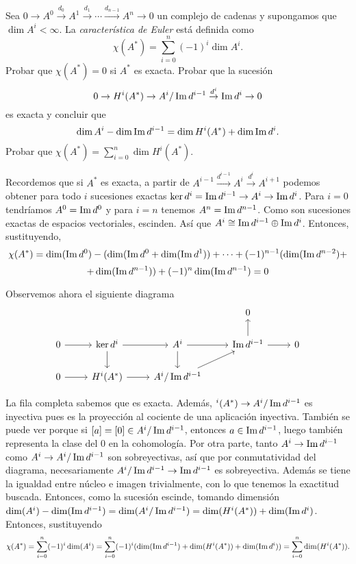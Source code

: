 \documentclass[twoside]{article}
\begin{document}
\begin{ejercicio}{4.4}
Sea $0\to A^0\overset{d_0}{\to}A^1\overset{d_1}{\to}\cdots\overset{d_{n-1}}{\to}A^n\to 0$ un complejo de cadenas y supongamos que $\dim A^i<\infty$. La \emph{característica de Euler} está definida como
\[
\chi(A^*)=\sum_{i=0}^n (-1)^i\dim A^i.
\]
Probar que $\chi(A^*)=0$ si $A^*$ es exacta. Probar que la sucesión 
\[
0\to H^i(A^*)\to A^i/\operatorname{Im} d^{i-1}\overset{d^i}{\to}\operatorname{Im} d^i\to 0
\]
es exacta y concluir que
\[
\dim A^i-\dim\operatorname{Im} d^{i-1}=\dim H^i(A^*)+\dim\operatorname{Im} d^i.
\]
Probar que $\chi(A^*)=\sum_{i=0}^n\dim H^i(A^*)$.
\end{ejercicio}
\begin{solucion}
Recordemos que si $A^*$ es exacta, a partir de $A^{i-1}\overset{d^{i-1}}{\to} A^i\overset{d^i}{\to} A^{i+1}$ podemos obtener para todo $i$ sucesiones exactas $\ker{d^i}=\operatorname{Im}{d^{i-1}}\to A^i\to \operatorname{Im}{d^i}$. Para $i=0$ tendríamos $A^0=\operatorname{Im}{d^0}$ y para $i=n$ tenemos $A^n=\operatorname{Im}{d^{n-1}}$. Como son sucesiones exactas de espacios vectoriales, escinden. Así que $A^i\cong \operatorname{Im}{d^{i-1}}\oplus\operatorname{Im}{d^i}$. Entonces, sustituyendo,
\[
\chi(A^*)=\dim(\operatorname{Im}{d^0})-(\dim(\operatorname{Im}{d^0}+\dim(\operatorname{Im}{d^1}))+\cdots +(-1)^{n-1}(\dim(\operatorname{Im}{d^{n-2}})+
\]
\[
+\dim(\operatorname{Im}{d^{n-1}}))+(-1)^n\dim(\operatorname{Im}{d^{n-1}})=0
\]

Observemos ahora el siguiente diagrama
\[
\begin{tikzcd}
 & & & 0 &  \\
 0\arrow[r] & \ker{d^i}\arrow[d]\arrow[r] & A^i\arrow[d]\arrow[r] & \Ima{d^{i-1}}\arrow[r]\arrow[u] & 0\\
0 \arrow[r] &  H^i(A^*)\arrow[r] & A^i/ \Ima{d^{i-1}}\arrow[ur] & & 
\end{tikzcd}
\]

La fila completa sabemos que es exacta.  Además, $^i(A^*)\to A^i/ \operatorname{Im}{d^{i-1}}$ es inyectiva pues es la proyección al cociente de una aplicación inyectiva. También se puede ver porque si $[a]=[0]\in  A^i/ \operatorname{Im}{d^{i-1}}$, entonces $a\in  \operatorname{Im}{d^{i-1}}$, luego también representa la clase del 0 en la cohomología. Por otra parte, tanto $A^i\to \operatorname{Im}{d^{i-1}}$ como $A^i\to A^i/ \operatorname{Im}{d^{i-1}}$ son sobreyectivas, así que por conmutatividad del diagrama, necesariamente $ A^i/ \operatorname{Im}{d^{i-1}}\to \operatorname{Im}{d^{i-1}}$ es sobreyectiva. Además se tiene la igualdad entre núcleo e imagen trivialmente, con lo que tenemos la exactitud buscada. Entonces, como la sucesión escinde, tomando dimensión $\dim(A^i)-\dim(\operatorname{Im}{d^{i-1}})=\dim(A^i/\operatorname{Im}{d^{i-1}})=\dim(H^i(A^ *))+\dim(\operatorname{Im}{d^i})$. Entonces, sustituyendo 
\[
\chi(A^*)=\sum_{i=0}^n(-1)^i\dim(A^i)=\sum_{i=0}^n(-1)^i(\dim(\operatorname{Im}{d^{i-1}})+\dim(H^i(A^*))+\dim(\operatorname{Im}{d^i}))=\sum_{i=0}^n\dim(H^i(A^*)).
\]
\end{solucion}
\end{document}
